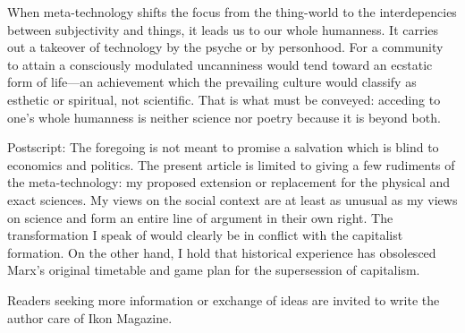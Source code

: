 When meta-technology shifts the focus from the thing-world to the interdepencies 
between subjectivity and things, it leads us to our whole humanness. It 
carries out a takeover of technology by the psyche or by personhood. For a 
community to attain a consciously modulated uncanniness would tend toward an 
ecstatic form of life---an achievement which the prevailing culture would classify as 
esthetic or spiritual, not scientific. That is what must be conveyed: acceding to 
one's whole humanness is neither science nor poetry because it is beyond both. 

\vfill

Postscript: The foregoing is not meant to promise a salvation which is blind 
to economics and politics. The present article is limited to giving a few rudiments 
of the meta-technology: my proposed extension or replacement for the physical 
and exact sciences. My views on the social context are at least as unusual as my 
views on science and form an entire line of argument in their own right. The 
transformation I speak of would clearly be in conflict with the capitalist formation. 
On the other hand, I hold that historical experience has obsolesced Marx's original 
timetable and game plan for the supersession of capitalism. 

Readers seeking more information or exchange of ideas are invited to write the 
author care of Ikon Magazine. 


